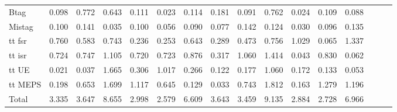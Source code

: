 \begin{tabular}{|l|ccc|ccc|ccc|ccc|ccc|}
      Btag                                       & 0.098 & 0.772 & 0.643 & 0.111 & 0.023 & 0.114 & 0.181 & 0.091 & 0.762 & 0.024 & 0.109 & 0.088 \\ 
      Mistag                                     & 0.100 & 0.141 & 0.035 & 0.100 & 0.056 & 0.090 & 0.077 & 0.142 & 0.124 & 0.030 & 0.096 & 0.135 \\ 
      tt fsr                                     & 0.760 & 0.583 & 0.743 & 0.236 & 0.253 & 0.643 & 0.289 & 0.473 & 0.756 & 1.029 & 0.065 & 1.337 \\ 
      tt isr                                     & 0.724 & 0.747 & 1.105 & 0.720 & 0.723 & 0.876 & 0.317 & 1.060 & 1.414 & 0.043 & 0.830 & 0.062 \\ 
      tt UE                                      & 0.021 & 0.037 & 1.665 & 0.306 & 1.017 & 0.266 & 0.122 & 0.177 & 1.060 & 0.172 & 0.133 & 0.053 \\ 
      tt MEPS                                    & 0.198 & 0.653 & 1.699 & 1.117 & 0.645 & 0.129 & 0.033 & 0.743 & 1.812 & 0.163 & 1.279 & 1.196 \\ 
      \hline
      Total                                      & 3.335 & 3.647 & 8.655 & 2.998 & 2.579 & 6.609 & 3.643 & 3.459 & 9.135 & 2.884 & 2.728 & 6.966 \\ 
      \hline
      \end{tabular}